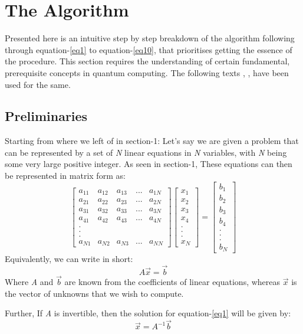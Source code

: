 \documentclass[12pt]{article}
\begin{document}
\section{The Algorithm}
Presented here is an intuitive step by step breakdown of the algorithm following through equation-\ref{eq1} to equation-\ref{eq10}, that prioritises getting the essence of the procedure. This section requires the understanding of certain fundamental, prerequisite concepts in quantum computing. The following texts \cite{Sevag}, \cite{Wolf}, \cite{gita} have been used for the same.

\subsection{Preliminaries}
Starting from where we left of in section-1: Let's say we are given a problem that can be represented by a set of \emph{N} linear equations in \emph{N} variables, with \emph{N} being some very large positive integer. As seen in section-1, These equations can then be represented in matrix form as: 
\begin{displaymath}
\begin{bmatrix}
a_{11} & a_{12} & a_{13} & ... & a_{1N}\\
a_{21} & a_{22} & a_{23} & ... & a_{2N}\\
a_{31} & a_{32} & a_{33} & ... & a_{3N}\\
a_{41} & a_{42} & a_{43} & ... & a_{4N}\\
.\\
.\\
.\\
a_{N1} & a_{N2} & a_{N3} & ... & a_{NN}
\end{bmatrix}
\begin{bmatrix}
x_1\\
x_2\\
x_3\\
x_4\\
.\\
.\\
.\\
x_N
\end{bmatrix} = \begin{bmatrix}
b_1\\
b_2\\
b_3\\
b_4\\
.\\
.\\
.\\
b_N
\end{bmatrix}
\end{displaymath}
Equivalently, we can write in short: 
\begin{equation} \label{eq1}
    A\vec{x} = \vec{b}
\end{equation}
Where \emph{A} and $\vec b$ are known from the coefficients of linear equations, whereas $\vec{x}$ is the vector of unknowns that we wish to compute.\par
Further, If \emph{A} is invertible, then the solution for equation-\ref{eq1} will be given by: 
\begin{equation} \label{eq2}
    \vec{x} = A^{-1}\vec{b}
\end{equation}
\end{document}
